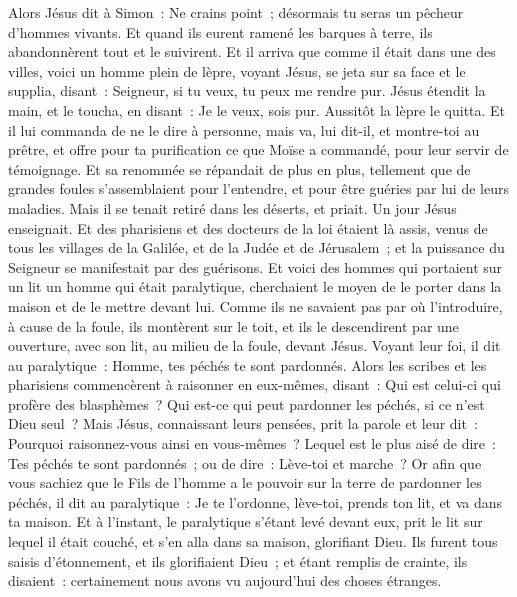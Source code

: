 \begin{multicols}{2}
Alors Jésus dit à Simon~: Ne crains point~; désormais tu seras un pêcheur d'hommes vivants.
Et quand ils eurent ramené les barques à terre, ils abandonnèrent tout et le suivirent.
Et il arriva que comme il était dans une des villes, voici un homme plein de lèpre, voyant Jésus, se jeta sur sa face et le supplia, disant~: Seigneur, si tu veux, tu peux me rendre pur.
Jésus étendit la main, et le toucha, en disant~: Je le veux, sois pur. Aussitôt la lèpre le quitta.
Et il lui commanda de ne le dire à personne, mais va, lui dit-il, et montre-toi au prêtre, et offre pour ta purification ce que Moïse a commandé, pour leur servir de témoignage.
Et sa renommée se répandait de plus en plus, tellement que de grandes foules s'assemblaient pour l'entendre, et pour être guéries par lui de leurs maladies.
Mais il se tenait retiré dans les déserts, et priait.
Un jour Jésus enseignait. Et des pharisiens et des docteurs de la loi étaient là assis, venus de tous les villages de la Galilée, et de la Judée et de Jérusalem~; et la puissance du Seigneur se manifestait par des guérisons.
Et voici des hommes qui portaient sur un lit un homme qui était paralytique, cherchaient le moyen de le porter dans la maison et de le mettre devant lui.
Comme ils ne savaient pas par où l'introduire, à cause de la foule, ils montèrent sur le toit, et ils le descendirent par une ouverture, avec son lit, au milieu de la foule, devant Jésus.
Voyant leur foi, il dit au paralytique~: Homme, tes péchés te sont pardonnés.
Alors les scribes et les pharisiens commencèrent à raisonner en eux-mêmes, disant~: Qui est celui-ci qui profère des blasphèmes~? Qui est-ce qui peut pardonner les péchés, si ce n'est Dieu seul~?
Mais Jésus, connaissant leurs pensées, prit la parole et leur dit~: Pourquoi raisonnez-vous ainsi en vous-mêmes~?
Lequel est le plus aisé de dire~: Tes péchés te sont pardonnés~; ou de dire~: Lève-toi et marche~?
Or afin que vous sachiez que le Fils de l'homme a le pouvoir sur la terre de pardonner les péchés, il dit au paralytique~: Je te l'ordonne, lève-toi, prends ton lit, et va dans ta maison.
Et à l'instant, le paralytique s'étant levé devant eux, prit le lit sur lequel il était couché, et s'en alla dans sa maison, glorifiant Dieu.
Ils furent tous saisis d'étonnement, et ils glorifiaient Dieu~; et étant remplis de crainte, ils disaient~: certainement nous avons vu aujourd'hui des choses étranges.

\end{multicols}

